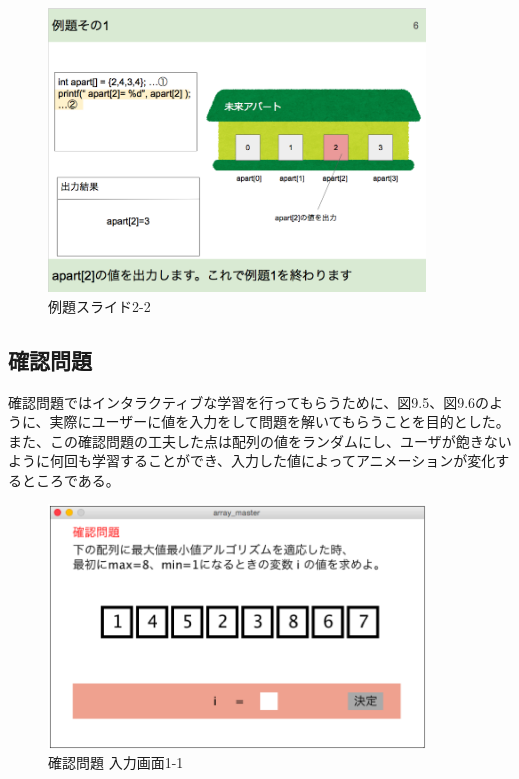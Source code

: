 \documentclass[openany,11pt,papersize]{jsbook}
\begin{document}
\begin{figure}[H]
\begin{center}
\includegraphics[width=10cm, bb=0 0 850 639]{img/9thParagraph/reidai_03.png}
\end{center}
\caption{例題スライド2-2}
\end{figure}


\subsection{確認問題}
確認問題ではインタラクティブな学習を行ってもらうために、図9.5、図9.6のように、実際にユーザーに値を入力をして問題を解いてもらうことを目的とした。また、この確認問題の工夫した点は配列の値をランダムにし、ユーザが飽きないように何回も学習することができ、入力した値によってアニメーションが変化するところである。


\begin{figure}[H]
\begin{center}
\includegraphics[width=10cm, bb=0 0 798 516]{img/9thParagraph/kakuninmondai_01.png}
\end{center}
\caption{確認問題 入力画面1-1}
\end{figure}
\end{document}
